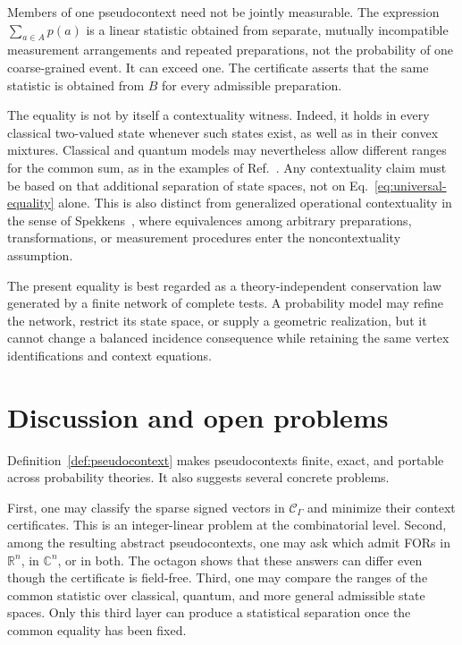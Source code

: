 \documentclass[
  twocolumn,
  aps,
  pra,
  floatfix,
  amsmath,amssymb,
  longbibliography
]{revtex4-2}
\theoremstyle{definition}
\theoremstyle{remark}
\newcommand{\R}{\mathbb R}
\newcommand{\C}{\mathbb C}
\begin{document}
Members of one pseudocontext need not be jointly measurable.  The expression
$\sum_{a\in A}p(a)$ is a linear statistic obtained from separate, mutually
incompatible measurement arrangements and repeated preparations, not the
probability of one coarse-grained event.  It can exceed one.  The certificate asserts that
the same statistic is obtained from $B$ for every admissible preparation.

The equality is not by itself a contextuality witness.  Indeed, it holds in
every classical two-valued state whenever such states exist, as well as in
their convex mixtures.  Classical and quantum models may nevertheless allow
different ranges for the common sum, as in the examples of
Ref.~\cite{2023-navara-svozil}.  Any contextuality claim must be based on that
additional separation of state spaces, not on Eq.~\eqref{eq:universal-equality}
alone.  This is also distinct from generalized operational contextuality in
the sense of Spekkens~\cite{Spekkens-04}, where equivalences among arbitrary
preparations, transformations, or measurement procedures enter the
noncontextuality assumption.

The present equality is best regarded as a theory-independent conservation
law generated by a finite network of complete tests.  A probability model
may refine the network, restrict its state space, or supply a geometric
realization, but it cannot change a balanced incidence consequence while
retaining the same vertex identifications and context equations.

\section{Discussion and open problems}

Definition~\ref{def:pseudocontext} makes pseudocontexts finite, exact, and portable across
probability theories.  It also suggests several concrete problems.

First, one may classify the sparse signed vectors in
$\mathcal C_\Gamma$ and minimize their context certificates.  This is an
integer-linear problem at the combinatorial level.  Second, among the
resulting abstract pseudocontexts, one may ask which admit FORs in $\R^n$,
in $\C^n$, or in both.  The octagon shows that
these answers can differ even though the certificate is field-free.  Third,
one may compare the ranges of the common statistic over classical,
quantum, and more general admissible state spaces.  Only this third layer can
produce a statistical separation once the common equality has been fixed.
\end{document}
